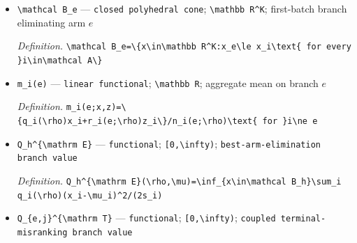\documentclass{article}
\begin{document}
\begin{itemize}
  \item \texttt{\textbackslash{}\allowbreak{}mathcal B\_\allowbreak{}e} --- \texttt{closed polyhedral cone}; \texttt{\textbackslash{}\allowbreak{}mathbb R\textasciicircum{}K}; first-batch branch eliminating arm \(e\)
  \par\smallskip\noindent\emph{Definition.} \texttt{\textbackslash{}\allowbreak{}mathcal B\_\allowbreak{}e=\allowbreak{}\textbackslash{}\allowbreak{}\{x\textbackslash{}\allowbreak{}in\textbackslash{}\allowbreak{}mathbb R\textasciicircum{}K:\allowbreak{}x\_\allowbreak{}e\textbackslash{}\allowbreak{}le x\_\allowbreak{}i\textbackslash{}\allowbreak{}text\{ for every \}\allowbreak{}i\textbackslash{}\allowbreak{}in\textbackslash{}\allowbreak{}mathcal A\textbackslash{}\allowbreak{}\}\allowbreak{}}
  \item \texttt{m\_\allowbreak{}i(e)} --- \texttt{linear functional}; \texttt{\textbackslash{}\allowbreak{}mathbb R}; aggregate mean on branch \(e\)
  \par\smallskip\noindent\emph{Definition.} \texttt{m\_\allowbreak{}i(e;\allowbreak{}x,\allowbreak{}z)=\allowbreak{}\textbackslash{}\allowbreak{}\{q\_\allowbreak{}i(\textbackslash{}\allowbreak{}rho)x\_\allowbreak{}i+\allowbreak{}r\_\allowbreak{}i(e;\allowbreak{}\textbackslash{}\allowbreak{}rho)z\_\allowbreak{}i\textbackslash{}\allowbreak{}\}\allowbreak{}/\allowbreak{}n\_\allowbreak{}i(e;\allowbreak{}\textbackslash{}\allowbreak{}rho)\textbackslash{}\allowbreak{}text\{ for \}\allowbreak{}i\textbackslash{}\allowbreak{}ne e}
  \item \texttt{Q\_\allowbreak{}h\textasciicircum{}\{\textbackslash{}\allowbreak{}mathrm E\}\allowbreak{}} --- \texttt{functional}; \texttt{[0,\allowbreak{}\textbackslash{}\allowbreak{}infty)}; \texttt{best-\allowbreak{}arm-\allowbreak{}elimination branch value}
  \par\smallskip\noindent\emph{Definition.} \texttt{Q\_\allowbreak{}h\textasciicircum{}\{\textbackslash{}\allowbreak{}mathrm E\}\allowbreak{}(\textbackslash{}\allowbreak{}rho,\allowbreak{}\textbackslash{}\allowbreak{}mu)=\allowbreak{}\textbackslash{}\allowbreak{}inf\_\allowbreak{}\{x\textbackslash{}\allowbreak{}in\textbackslash{}\allowbreak{}mathcal B\_\allowbreak{}h\}\allowbreak{}\textbackslash{}\allowbreak{}sum\_\allowbreak{}i q\_\allowbreak{}i(\textbackslash{}\allowbreak{}rho)(x\_\allowbreak{}i-\allowbreak{}\textbackslash{}\allowbreak{}mu\_\allowbreak{}i)\textasciicircum{}2/\allowbreak{}(2s\_\allowbreak{}i)}
  \item \texttt{Q\_\allowbreak{}\{e,\allowbreak{}j\}\allowbreak{}\textasciicircum{}\{\textbackslash{}\allowbreak{}mathrm T\}\allowbreak{}} --- \texttt{functional}; \texttt{[0,\allowbreak{}\textbackslash{}\allowbreak{}infty)}; \texttt{coupled terminal-\allowbreak{}misranking branch value}

\end{itemize}
\end{document}
